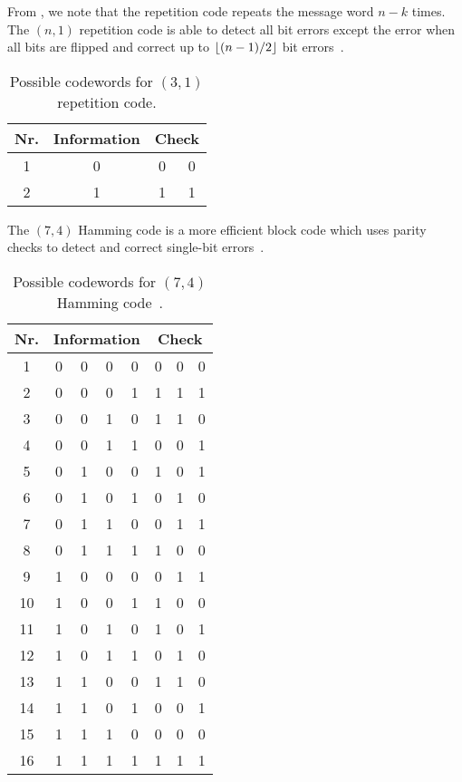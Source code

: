 From , we note that the repetition code repeats the message word $n-k$ times.
The $(n,1)$ repetition code is able to detect all bit errors except the error when all bits are flipped and correct up to $\left\lfloor(n-1)/2\right\rfloor$ bit errors~\cite[p.~5]{MacKay2003}.
\begin{table}[htb]
	\centering
	\begin{tabular}{c|c|cc}
		\toprule
		Nr. & Information & \multicolumn{2}{c}{Check} \\
		\midrule
			1 & 0 & 0 & 0 \\
			2 & 1 & 1 & 1 \\
		\bottomrule
	\end{tabular}
	\caption{Possible codewords for $(3,1)$ repetition code.}\label{tab:repetition_codewords}
\end{table}
The $(7,4)$ Hamming code is a more efficient block code which uses parity checks to detect and correct single-bit errors~\cite[p.~10]{MacKay2003}.
\begin{table}[htb]
	\centering
	\begin{tabular}{c|cccc|ccc}
		\toprule
		Nr. & \multicolumn{4}{c}{Information} & \multicolumn{3}{c}{Check} \\
		\midrule
			1 & 0 & 0 & 0 & 0 & 0 & 0 & 0 \\
			2 & 0 & 0 & 0 & 1 & 1 & 1 & 1 \\
			3 & 0 & 0 & 1 & 0 & 1 & 1 & 0 \\
			4 & 0 & 0 & 1 & 1 & 0 & 0 & 1 \\
			5 & 0 & 1 & 0 & 0 & 1 & 0 & 1 \\
			6 & 0 & 1 & 0 & 1 & 0 & 1 & 0 \\
			7 & 0 & 1 & 1 & 0 & 0 & 1 & 1 \\
			8 & 0 & 1 & 1 & 1 & 1 & 0 & 0 \\
			9 & 1 & 0 & 0 & 0 & 0 & 1 & 1 \\
			10 & 1 & 0 & 0 & 1 & 1 & 0 & 0 \\
			11 & 1 & 0 & 1 & 0 & 1 & 0 & 1 \\
			12 & 1 & 0 & 1 & 1 & 0 & 1 & 0 \\
			13 & 1 & 1 & 0 & 0 & 1 & 1 & 0 \\
			14 & 1 & 1 & 0 & 1 & 0 & 0 & 1 \\
			15 & 1 & 1 & 1 & 0 & 0 & 0 & 0 \\
			16 & 1 & 1 & 1 & 1 & 1 & 1 & 1 \\
		\bottomrule
	\end{tabular}
	\caption{Possible codewords for $(7,4)$ Hamming code~\cite[p.~109]{Mildenberger2013}.}\label{tab:hamming_codewords}
\end{table}
